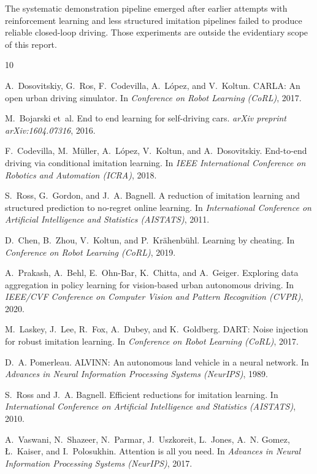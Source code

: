 \documentclass[11pt]{article}
\begin{document}
The systematic demonstration pipeline emerged after earlier attempts with reinforcement learning and less structured imitation pipelines failed to produce reliable closed-loop driving. Those experiments are outside the evidentiary scope of this report.


\begin{thebibliography}{10}
\small

A.~Dosovitskiy, G.~Ros, F.~Codevilla, A.~L\'opez, and V.~Koltun.
\newblock CARLA: An open urban driving simulator.
\newblock In \emph{Conference on Robot Learning (CoRL)}, 2017.

M.~Bojarski et~al.
\newblock End to end learning for self-driving cars.
\newblock \emph{arXiv preprint arXiv:1604.07316}, 2016.

F.~Codevilla, M.~M\"uller, A.~L\'opez, V.~Koltun, and A.~Dosovitskiy.
\newblock End-to-end driving via conditional imitation learning.
\newblock In \emph{IEEE International Conference on Robotics and Automation (ICRA)}, 2018.

S.~Ross, G.~Gordon, and J.~A. Bagnell.
\newblock A reduction of imitation learning and structured prediction to no-regret online learning.
\newblock In \emph{International Conference on Artificial Intelligence and Statistics (AISTATS)}, 2011.

D.~Chen, B.~Zhou, V.~Koltun, and P.~Kr\"ahenb\"uhl.
\newblock Learning by cheating.
\newblock In \emph{Conference on Robot Learning (CoRL)}, 2019.

A.~Prakash, A.~Behl, E.~Ohn-Bar, K.~Chitta, and A.~Geiger.
\newblock Exploring data aggregation in policy learning for vision-based urban autonomous driving.
\newblock In \emph{IEEE/CVF Conference on Computer Vision and Pattern Recognition (CVPR)}, 2020.

M.~Laskey, J.~Lee, R.~Fox, A.~Dubey, and K.~Goldberg.
\newblock DART: Noise injection for robust imitation learning.
\newblock In \emph{Conference on Robot Learning (CoRL)}, 2017.

D.~A. Pomerleau.
\newblock ALVINN: An autonomous land vehicle in a neural network.
\newblock In \emph{Advances in Neural Information Processing Systems (NeurIPS)}, 1989.

S.~Ross and J.~A. Bagnell.
\newblock Efficient reductions for imitation learning.
\newblock In \emph{International Conference on Artificial Intelligence and Statistics (AISTATS)}, 2010.

A.~Vaswani, N.~Shazeer, N.~Parmar, J.~Uszkoreit, L.~Jones, A.~N. Gomez, {\L}.~Kaiser, and I.~Polosukhin.
\newblock Attention is all you need.
\newblock In \emph{Advances in Neural Information Processing Systems (NeurIPS)}, 2017.

\end{thebibliography}
\end{document}
